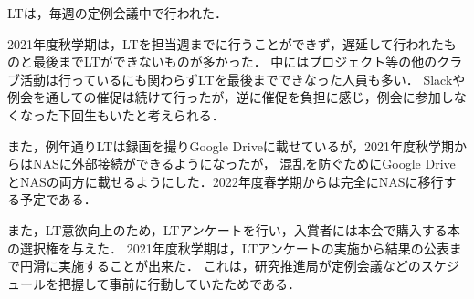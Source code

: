 LTは，毎週の定例会議中で行われた．

2021年度秋学期は，LTを担当週までに行うことができず，遅延して行われたものと最後までLTができないものが多かった．
中にはプロジェクト等の他のクラブ活動は行っているにも関わらずLTを最後までできなった人員も多い．
Slackや例会を通しての催促は続けて行ったが，逆に催促を負担に感じ，例会に参加しなくなった下回生もいたと考えられる．

また，例年通りLTは録画を撮りGoogle Driveに載せているが，2021年度秋学期からはNASに外部接続ができるようになったが，
混乱を防ぐためにGoogle DriveとNASの両方に載せるようにした．2022年度春学期からは完全にNASに移行する予定である．

また，LT意欲向上のため，LTアンケートを行い，入賞者には本会で購入する本の選択権を与えた．
2021年度秋学期は，LTアンケートの実施から結果の公表まで円滑に実施することが出来た．
これは，研究推進局が定例会議などのスケジュールを把握して事前に行動していたためである．


